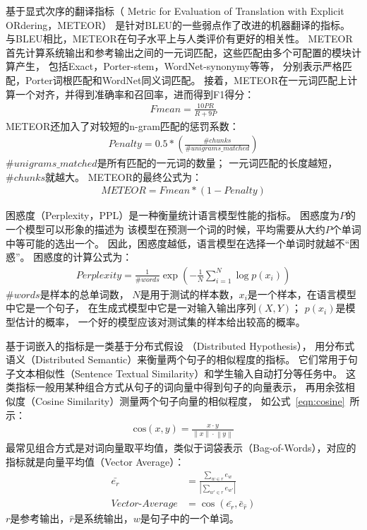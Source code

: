 基于显式次序的翻译指标（
Metric for Evaluation of Translation with Explicit ORdering，METEOR）
是针对BLEU的一些弱点作了改进的机器翻译的指标。
与BLEU相比，METEOR在句子水平上与人类评价有更好的相关性。
METEOR首先计算系统输出和参考输出之间的一元词匹配，这些匹配由多个可配置的模块计算产生，
包括Exact，Porter-stem，WordNet-synonymy等等，
分别表示严格匹配，Porter词根匹配和WordNet同义词匹配。
接着，METEOR在一元词匹配上计算一个对齐，并得到准确率和召回率，进而得到F1得分：
\begin{align}
    \textit{Fmean} = \frac{10PR}{R + 9P}
\end{align}
METEOR还加入了对较短的n-gram匹配的惩罚系数：
\begin{align}
    \textit{Penalty} = 0.5 * \left( \frac{\#chunks}{\#unigrams\_matched} \right)
\end{align}
$\#unigrams\_matched$是所有匹配的一元词的数量；
一元词匹配的长度越短，$\#chunks$就越大。
METEOR的最终公式为：
\begin{align}
    \textit{METEOR} = \textit{Fmean} * (1 - \textit{Penalty})
\end{align}

困惑度（Perplexity，PPL）是一种衡量统计语言模型性能的指标。
困惑度为$P$的一个模型可以形象的描述为
该模型在预测一个词的时候，平均需要从大约$P$个单词中等可能的选出一个。
因此，困惑度越低，语言模型在选择一个单词时就越不“困惑”。
困惑度的计算公式为：
\begin{align}
    \textit{Perplexity} = \frac{1}{\#\textit{words}} \exp(-\frac{1}{N} \sum_{i=1}^N \log p(x_i))
\end{align}
$\#words$是样本的总单词数，
$N$是用于测试的样本数，$x_i$是一个样本，在语言模型中它是一个句子，
在生成式模型中它是一对输入输出序列$(X, Y)$；
$p(x_i)$是模型估计的概率，
一个好的模型应该对测试集的样本给出较高的概率。

基于词嵌入的指标是一类基于分布式假设
（Distributed Hypothesis），
用分布式语义（Distributed Semantic）来衡量两个句子的相似程度的指标。
它们常用于句子文本相似性（Sentence Textual Similarity）和学生输入自动打分等任务中。
这类指标一般用某种组合方式从句子的词向量中得到句子的向量表示，
再用余弦相似度（Cosine Similarity）测量两个句子向量的相似程度，
如公式~\ref{eqn:cosine}~所示：
\begin{align}
    \text{cos}(x, y) = \frac{x\cdot y}
    {\left\| x \right\| \cdot \left\| y \right\|}
    \label{eqn:cosine}
\end{align}
最常见组合方式是对词向量取平均值，类似于词袋表示（Bag-of-Words），对应的指标就是向量平均值（Vector Average）：
\begin{align}
    \bar{e_r} &= \frac{\sum_{w \in r} e_w}{|\sum_{w' \in r} e_{w'}|} \\
    \textit{Vector-Average} &= \cos(\bar{e_r}, \bar{e}_{\hat{r}})
\end{align}
$r$是参考输出，$\hat{r}$是系统输出，$w$是句子中的一个单词。

